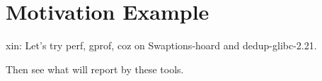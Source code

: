\section{Motivation Example}

xin: 
Let's try perf, gprof, coz on Swaptions-hoard and dedup-glibc-2.21. 

Then see what will report by these tools. 